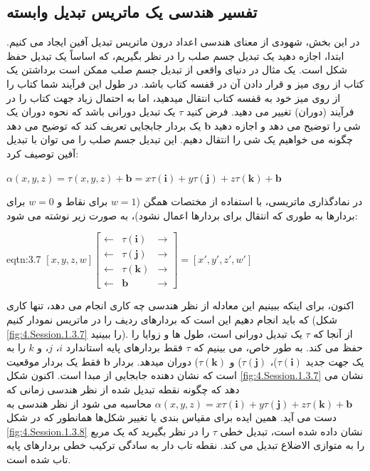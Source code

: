 \subsection{\textbf{تفسیر هندسی یک ماتریس تبدیل وابسته}}
{
    \Large
    \begin{spacing}{1.5}
        در این بخش، شهودی از معنای هندسی اعداد درون ماتریس تبدیل آفین ایجاد می کنیم.
        ابتدا، اجازه دهید یک تبدیل جسم صلب را در نظر بگیریم، که اساساً یک تبدیل حفظ شکل است.
        یک مثال در دنیای واقعی از تبدیل جسم صلب ممکن است برداشتن یک کتاب از روی میز و قرار دادن آن در قفسه کتاب باشد.
        در طول این فرآیند شما کتاب را از روی میز خود به قفسه کتاب انتقال میدهید، اما به احتمال زیاد جهت کتاب را در فرآیند (دوران) تغییر می دهید.
        فرض کنید $\tau$ یک تبدیل دورانی باشد که نحوه دوران یک شی را توضیح می دهد و اجازه دهید $\textbf{b}$ یک بردار جابجایی تعریف کند که توضیح می دهد چگونه می خواهیم یک شی را انتقال دهیم. این تبدیل جسم صلب را می توان با تبدیل آفین توصیف کرد:

        \begin{center}
            $\alpha(x,y,z)=\tau(x,y,z)+\textbf{b}=x\tau(\textbf{i})+y\tau(\textbf{j})+z\tau(\textbf{k})+\textbf{b}$
        \end{center}

        در نمادگذاری ماتریسی، با استفاده از مختصات همگن ($w=1$ برای نقاط و $w=0$ برای بردارها به طوری که انتقال برای بردارها اعمال نشود)، به صورت زیر نوشته می شود:

        \begin{eqtn}{eqtn:3.7}
            \centering
            $[x,y,z,w]\begin{bmatrix}
                          \leftarrow & \tau(\textbf{i}) & \rightarrow \\
                          \leftarrow & \tau(\textbf{j}) & \rightarrow \\
                          \leftarrow & \tau(\textbf{k}) & \rightarrow \\
                          \leftarrow & \textbf{b}       & \rightarrow
            \end{bmatrix}=[x\prime,y\prime,z\prime,w\prime]$
        \end{eqtn}

        اکنون، برای اینکه ببینیم این معادله از نظر هندسی چه کاری انجام می دهد، تنها کاری که باید انجام دهیم این است که بردارهای ردیف را در ماتریس نمودار کنیم (شکل \ref{fig:4.Session.1.3.7} را ببینید).
        از آنجا که $\tau$ یک تبدیل دورانی است، طول ها و زوایا را حفظ می کند.
        به طور خاص، می بینیم که $\tau$ فقط بردارهای پایه استاندارد $i$، $j$، و $k$ را به یک جهت جدید $\tau(\textbf{i})$)، $\tau(\textbf{j})$) و $\tau(\textbf{k})$) دوران میدهد.
        بردار $\textbf{b}$ فقط یک بردار موقعیت است که نشان دهنده جابجایی از مبدا است.
        اکنون شکل \ref{fig:4.Session.1.3.7} نشان می دهد که چگونه نقطه تبدیل شده از نظر هندسی زمانی که $\alpha(x,y,z)=x\tau(\textbf{i})+y\tau(\textbf{j})+z\tau(\textbf{k})+\textbf{b}$ محاسبه می شود از نظر هندسی به دست می آید.
        همین ایده برای مقیاس بندی یا تغییر شکل‌ها همانطور که در شکل \ref{fig:4.Session.1.3.8} نشان داده شده است،
        تبدیل خطی $\tau$ را در نظر بگیرید که یک مربع را به متوازی الاضلاع تبدیل می کند.
        نقطه تاب دار به سادگی ترکیب خطی بردارهای پایه تاب شده است.


\end{spacing}}
